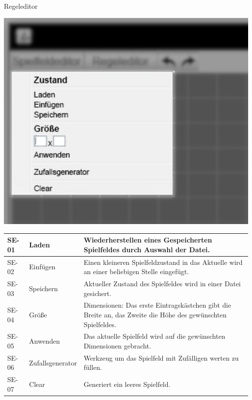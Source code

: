 \documentclass[11pt,a4paper]{article}
\begin{document}
	
\pagebreak
\par
    Regeleditor %
    \par
    \includegraphics[width=15cm]{spielfeldeditor_dropdown_edit.jpeg} %

    \begin{longtable}[m]{|m{2cm}|m{4cm}|m{9cm}|} %
        \hline
        SE-01 & Laden & Wiederherstellen eines Gespeicherten Spielfeldes durch Auswahl der Datei. \\
        \hline
        SE-02 & Einfügen & Einen kleineren Spielfeldzustand in das Aktuelle wird an einer beliebigen Stelle eingefügt. \\
        \hline
        SE-03 & Speichern & Aktueller Zustand des Spielfeldes wird in einer Datei gesichert. \\
        \hline
        SE-04 & Größe & Dimensionen: Das erste Eintragskästchen gibt die Breite an, das Zweite die Höhe des gewünschten Spielfeldes.\\
        \hline
        SE-05 & Anwenden & Das aktuelle Spielfeld wird auf die gewünschten Dimensionen gebracht. \\
        \hline
        SE-06 & Zufallsgenerator & Werkzeug um das Spielfeld mit Zufälligen werten zu füllen.\\
        \hline
        SE-07 & Clear & Generiert ein leeres Spielfeld.\\
        \hline
    \end{longtable}
    
\end{document}
